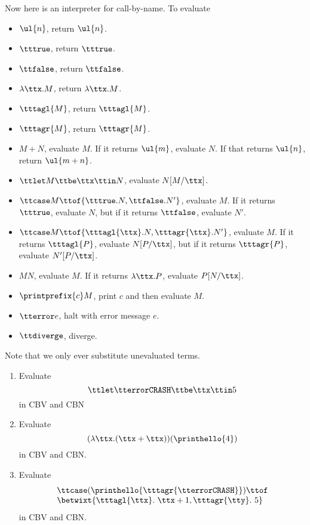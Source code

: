 \documentclass[runningheads,12pt]{llncs}
\begin{document}
Now here is an interpreter for call-by-name.  To evaluate
\begin{itemize}
\item  $\ul{n}$, return $\ul{n}$.
\item $\tttrue$, return $\tttrue$.
\item $\ttfalse$, return $\ttfalse$.
\item $\lambda \ttx. M$, return $\lambda \ttx. M$.
\item $\tttagl{M}$, return $\tttagl{M}$. 
\item $\tttagr{M}$, return $\tttagr{M}$. 
\item $M+N$, evaluate $M$.  If it returns $\ul{m}$, evaluate $N$.  If that returns $\ul{n}$, return $\ul{m+n}$.
\item $\ttlet M \ttbe \ttx \ttin N$, evaluate $N[M/\ttx]$.
\item $\ttcase M \ttof \{ \tttrue. N, \ttfalse. N' \}$, evaluate $M$.  If it returns $\tttrue$, evaluate $N$, but if it returns $\ttfalse$, evaluate $N'$.
\item $\ttcase M \ttof \{ \tttagl{\ttx}. N, \tttagr{\ttx}. N' \}$, evaluate $M$.  If it returns $\tttagl{P}$, evaluate $N[P/\ttx]$, but if it returns $\tttagr{P}$, evaluate $N'[P/\ttx]$.
\item $MN$, evaluate $M$.  If it returns $\lambda \ttx. P$, evaluate $P[N/\ttx]$.
\item $\printprefix{c}M$, print $c$ and then evaluate $M$.
\item $\tterror e$, halt with error message $e$.
\item $\ttdiverge$, diverge.
\end{itemize}
Note that we only ever substitute unevaluated terms.

\begin{exercise}
  \begin{enumerate}
  \item Evaluate
   \begin{displaymath}
      \ttlet \tterror \mathtt{CRASH} \ttbe \ttx \ttin 5
    \end{displaymath}
in CBV and CBN
 \item Evaluate
   \begin{displaymath}
   ( \lambda \ttx. (\ttx + \ttx) ) (\printhello{4})
   \end{displaymath}
in CBV and CBN.
\item Evaluate
  \begin{displaymath}
    \begin{array}{l}
    \ttcase (\printhello{\tttagr{\tterror \mathtt{CRASH}}}) \ttof \\
 \betwixt \{ \tttagl{\ttx}.\ \ttx+1, \tttagr{\tty}.\ 5 \}
  \end{array}
  \end{displaymath}
in CBV and CBN.
\end{enumerate}
\end{exercise}
\end{document}
